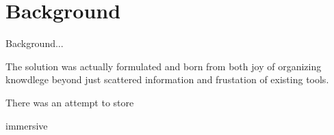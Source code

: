 \section{Background}
\label{sec:background}

Background...


The solution was actually formulated and born from both joy of organizing knowdlege beyond just scattered information and frustation of existing tools.

There was an attempt to store


immersive

